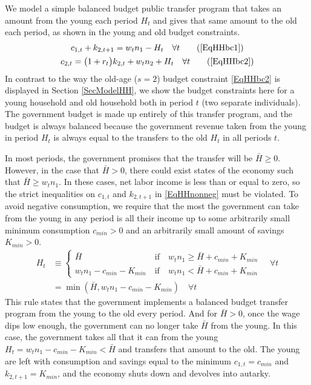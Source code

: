 \documentclass[letterpaper,12pt]{article}
\theoremstyle{definition}
\begin{document}
\begin{spacing}{1.5}
    We model a simple balanced budget public transfer program that takes an amount from the young each period $H_t$ and gives that same amount to the old each period, as shown in the young and old budget constraints.
    \begin{gather}
      c_{1,t} + k_{2,t+1} = w_t n_1 - H_t \quad\forall t \tag{\ref{EqHHbc1}} \\
      c_{2,t} = \bigl(1+r_t\bigr)k_{2,t} + w_t n_2 + H_t \quad\forall t \tag{\ref{EqHHbc2}}
    \end{gather}
    In contrast to the way the old-age ($s=2$) budget constraint \eqref{EqHHbc2} is displayed in Section \ref{SecModelHH}, we show the budget constraints here for a young household and old household both in period $t$ (two separate individuals). The government budget is made up entirely of this transfer program, and the budget is always balanced because the government revenue taken from the young in period $H_t$ is always equal to the transfers to the old $H_t$ in all periods $t$.

    In most periods, the government promises that the transfer will be $\bar{H}\geq 0$. However, in the case that $\bar{H}>0$, there could exist states of the economy such that $\bar{H}\geq w_t n_1$. In these cases, net labor income is less than or equal to zero, so the strict inequalities on $c_{1,t}$ and $k_{2,t+1}$ in \eqref{EqHHnonneg} must be violated. To avoid negative consumption, we require that the most the government can take from the young in any period is all their income up to some arbitrarily small minimum consumption $c_{min}>0$ and an arbitrarily small amount of savings $K_{min}>0$.
    \begin{equation}\label{EqGovt_Ht}
      \begin{split}
        H_t &\equiv
          \begin{cases}
            \bar{H} \qquad\qquad\qquad\qquad\:\:\,\text{if}\quad w_t n_1 \geq \bar{H} + c_{min} + K_{min} \\
            w_t n_1 - c_{min} - K_{min} \quad\text{if}\quad w_t n_1 < \bar{H} + c_{min} + K_{min}
          \end{cases} \quad\forall t \\
          &= \min\left(\bar{H}, w_t n_1 - c_{min} - K_{min}\right) \quad\forall t
      \end{split}
    \end{equation}
    This rule states that the government implements a balanced budget transfer program from the young to the old every period. And for $\bar{H}>0$, once the wage dips low enough, the government can no longer take $\bar{H}$ from the young. In this case, the government takes all that it can from the young $H_t = w_t n_1 - c_{min} - K_{min}<\bar{H}$ and transfers that amount to the old. The young are left with consumption and savings equal to the minimum $c_{1,t}=c_{min}$ and $k_{2,t+1}=K_{min}$, and the economy shuts down and devolves into autarky.



\end{spacing}
\end{document}
